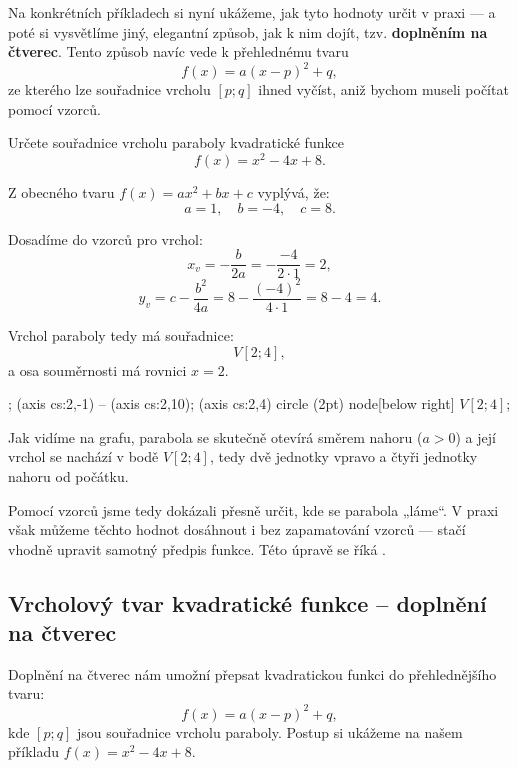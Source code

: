 \documentclass[12pt,a4paper]{article}
\begin{document}
\medskip
Na konkrétních příkladech si nyní ukážeme, jak tyto hodnoty určit v praxi — a poté si vysvětlíme jiný, elegantní způsob, jak k nim dojít, tzv. \textbf{doplněním na čtverec}.  
Tento způsob navíc vede k přehlednému tvaru
\[
f(x) = a(x - p)^2 + q,
\]
ze kterého lze souřadnice vrcholu \([p; q]\) ihned vyčíst, aniž bychom museli počítat pomocí vzorců.
\begin{examplebox}
Určete souřadnice vrcholu paraboly kvadratické funkce
\[
f(x) = x^2 - 4x + 8.
\]

Z obecného tvaru \(f(x) = ax^2 + bx + c\) vyplývá, že:
\[
a = 1, \quad b = -4, \quad c = 8.
\]

Dosadíme do vzorců pro vrchol:
\[
x_v = -\frac{b}{2a} = -\frac{-4}{2 \cdot 1} = 2,
\]
\[
y_v = c - \frac{b^2}{4a} = 8 - \frac{(-4)^2}{4 \cdot 1} = 8 - 4 = 4.
\]

Vrchol paraboly tedy má souřadnice:
\[
V[2; 4],
\]
a osa souměrnosti má rovnici \(x = 2\).
\end{examplebox}

\begin{center}
\begin{axisgraph}[
  xmin=-1, xmax=6,
  ymin=-1, ymax=10,
  samples=200,
  width=9cm,
  height=6cm,
  title={Graf funkce $y = x^2 - 4x + 8$}
]
  ;
   (axis cs:2,-1) -- (axis cs:2,10);
   (axis cs:2,4) circle (2pt) node[below right] {$V[2;4]$};
\end{axisgraph}
\end{center}

Jak vidíme na grafu, parabola se skutečně otevírá směrem nahoru (\(a>0\))  
a její vrchol se nachází v bodě \(V[2;4]\), tedy dvě jednotky vpravo a čtyři jednotky nahoru od počátku.

\medskip
Pomocí vzorců jsme tedy dokázali přesně určit, kde se parabola „láme“.  
V praxi však můžeme těchto hodnot dosáhnout i bez zapamatování vzorců — stačí vhodně upravit samotný předpis funkce.  
Této úpravě se říká .

\subsection{Vrcholový tvar kvadratické funkce – doplnění na čtverec}

Doplnění na čtverec nám umožní přepsat kvadratickou funkci do přehlednějšího tvaru:
\[
f(x) = a(x - p)^2 + q,
\]
kde \([p; q]\) jsou souřadnice vrcholu paraboly.  
Postup si ukážeme na našem příkladu \(f(x) = x^2 - 4x + 8\).
\end{document}
